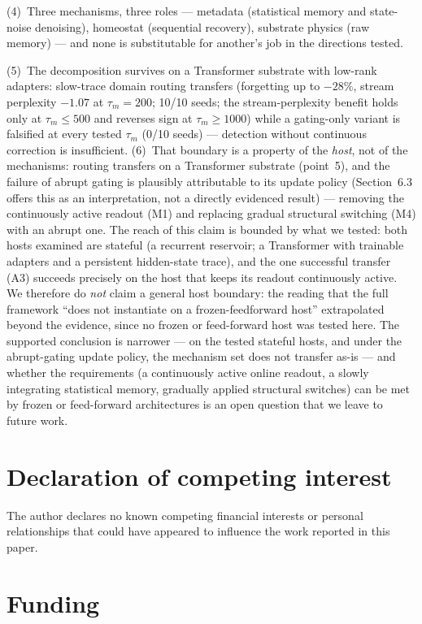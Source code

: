 \documentclass[preprint,12pt]{elsarticle}
\begin{document}
(4)~Three mechanisms, three roles --- metadata (statistical memory and
state-noise denoising), homeostat (sequential recovery), substrate physics
(raw memory) --- and none is substitutable for another's job in the
directions tested.

(5)~The decomposition survives on a Transformer substrate with
low-rank adapters: slow-trace domain routing transfers (forgetting up to
$-28\%$, stream perplexity $-1.07$ at $\tau_m{=}200$; 10/10 seeds; the
stream-perplexity benefit holds only at $\tau_m\le500$ and reverses sign
at $\tau_m\ge1000$) while
a gating-only variant is falsified at every tested $\tau_m$ (0/10 seeds) ---
detection without continuous correction is insufficient.
(6)~That boundary is a property of the \emph{host}, not of the
mechanisms: routing transfers on a Transformer substrate (point~5), and
the failure of abrupt gating is plausibly attributable to its update
policy (Section~6.3 offers this as an interpretation, not a directly
evidenced result) ---
removing the continuously active readout (M1) and replacing gradual
structural switching (M4) with an abrupt one. The reach of this claim is
bounded by what we tested: both hosts examined are stateful (a recurrent
reservoir; a Transformer with trainable adapters and a persistent
hidden-state trace), and the one successful transfer (A3) succeeds
precisely on the host that keeps its readout continuously active. We
therefore do \emph{not} claim a general host boundary: the reading that
the full framework ``does not instantiate on a frozen-feedforward host''
extrapolated beyond the evidence, since no frozen or feed-forward host
was tested here. The supported conclusion is narrower --- on the tested
stateful hosts, and under the abrupt-gating update policy, the
mechanism set does not transfer as-is --- and whether the requirements
(a continuously active online readout, a slowly integrating statistical
memory, gradually applied structural switches) can be met by frozen or
feed-forward architectures is an open question that we leave to future
work.

\section*{Declaration of competing interest}

The author declares no known competing financial interests or personal
relationships that could have appeared to influence the work reported in
this paper.

\section*{Funding}
\end{document}
